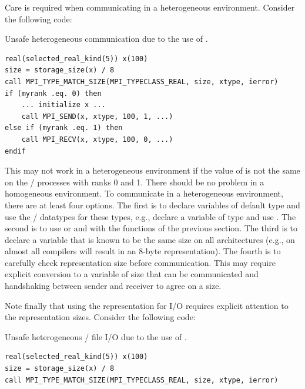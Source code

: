\begin{users}
Care is required when communicating in a heterogeneous
environment. Consider the following code:
\begin{example}
Unsafe heterogeneous communication due to the use of .
\label{exa:lang:typematch:unsafe}
%
\begin{lstlisting}[language={[MPI08]Fortran}]
real(selected_real_kind(5)) x(100)
size = storage_size(x) / 8
call MPI_TYPE_MATCH_SIZE(MPI_TYPECLASS_REAL, size, xtype, ierror)
if (myrank .eq. 0) then
    ... initialize x ...
    call MPI_SEND(x, xtype, 100, 1, ...)
else if (myrank .eq. 1) then
    call MPI_RECV(x, xtype, 100, 0, ...)
endif
\end{lstlisting}
\end{example}
This may not work in a heterogeneous environment
if the value of  is not the same on the \MPI/ processes with ranks 0 and 1.
There should be no problem in a homogeneous environment.
To communicate in a heterogeneous environment, there are at least four
options. The first is to declare variables of default type and use
the \MPI/ datatypes for these types, e.g., declare a variable of type
 and use .  The second is to use
 or  and
with the functions of the previous section.
The third is to declare a variable
that is known to be the same size on all architectures (e.g.,
 on almost all compilers will result in an 8-byte
representation). The fourth is to carefully check
representation size before communication. This may require explicit
conversion to a variable of size that can be communicated and
handshaking between sender and receiver to agree on a size.

Note finally that using the  representation for I/O
requires explicit attention to the representation sizes. Consider the
following code:

\begin{example}
Unsafe heterogeneous \MPI/ file I/O due to the use of .
\label{exa:lang:typematch:unsafe:io}
%
\begin{lstlisting}[language={[MPI08]Fortran}]
real(selected_real_kind(5)) x(100)
size = storage_size(x) / 8
call MPI_TYPE_MATCH_SIZE(MPI_TYPECLASS_REAL, size, xtype, ierror)


\end{lstlisting}
\end{example}
\end{users}
